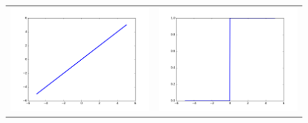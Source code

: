 \begin{figure}
\begin{center}
\begin{tabular}{cc}
\includegraphics[scale=0.25]{images/chapter1/id.png} & \includegraphics[scale=0.25]{images/chapter1/u.png} \\

\end{tabular}
\end{center}
\end{figure}
